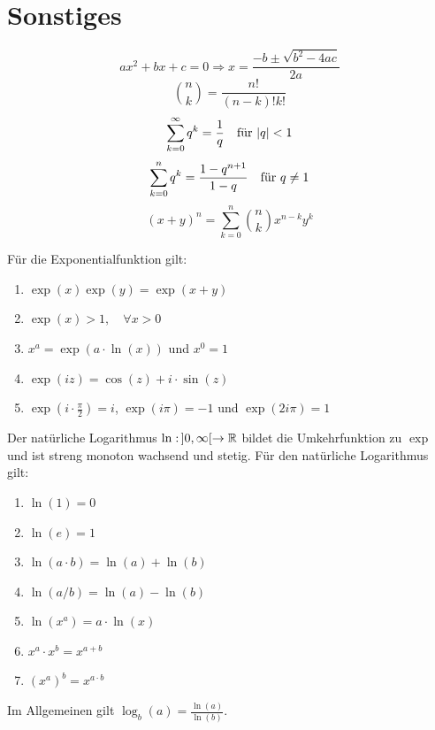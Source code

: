 \section*{Sonstiges}



$$ax^2 + bx + c = 0 \Rightarrow x = \frac{-b \pm \sqrt{b^2 - 4ac}}{2a}$$
$$\binom{n}{k} = \frac{n!}{(n-k)!k!}$$
$$\sum\limits_{k=0}^\infty q^k = \frac{1}{q	} \quad \text{für } |q| < 1$$
$$\sum\limits_{k=0}^n q^k = \frac{1 - q^{n+1}}{1 - q} \quad \text{für } q \neq 1$$
$$(x+y)^n = \sum_{k=0}^n \binom{n}{k} x^{n-k} y^k$$





Für die Exponentialfunktion gilt:
\begin{enumerate}[label = (\arabic*)]
	\item $\exp(x) \exp(y) = \exp(x+y)$
	\item $\exp(x) > 1, \quad \forall x > 0$
	\item $x^a = \exp(a \cdot \ln(x))$ und $x^0 = 1$
	\item $\exp(iz) = \cos(z) + i \cdot \sin(z)$
	\item $\exp(i \cdot \frac{\pi}{2}) = i$, $\exp(i \pi) = -1$ und $\exp(2 i \pi) = 1$
\end{enumerate}

Der natürliche Logarithmus $\ln : \, ]0, \infty[ \to \mathbb{R}$ bildet die Umkehrfunktion zu $\exp$ und ist
streng monoton wachsend und stetig. Für den natürliche Logarithmus gilt:

\begin{enumerate}[label = (\arabic*)]
	\item $\ln(1) = 0$
	\item $\ln(e) = 1$
	\item $\ln(a \cdot b) = \ln(a) + \ln(b)$
	\item $\ln(a / b) = \ln(a) - \ln(b)$
	\item $\ln(x^a) = a \cdot \ln(x)$
	\item $x^a \cdot x^b = x^{a + b}$
	\item $(x^a)^b = x^{a \cdot b}$
\end{enumerate}

Im Allgemeinen gilt $\log_b(a) = \frac{\ln(a)}{\ln(b)}$.



